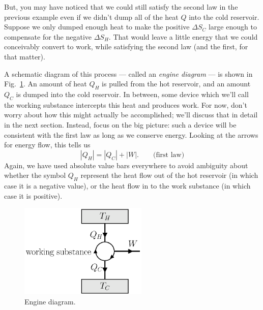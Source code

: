 But, you may have noticed that we could still satisfy the second law in
the previous example even if we didn't dump all of the heat $Q$ into the
cold reservoir.  Suppose we only dumped enough heat to make the positive
$\Delta S_C$ large enough to compensate for the negative $\Delta S_H$.
That would leave a little energy that we could conceivably convert to
work, while satisfying the second law (and the first, for that matter).

A schematic diagram of this process --- called an {\it engine diagram}
--- is shown in Fig.~\ref{fig:engine_diagram}.  An amount of heat
$Q_H$ is pulled from the hot reservoir, and an amount $Q_C$ is dumped
into the cold reservoir.  In between, some device which we'll call the
working substance intercepts this heat and produces work.  For now,
don't worry about how this might actually be accomplished; we'll
discuss that in detail in the next section.  Instead, focus on the big
picture: such a device will be consistent with the first law as long
as we conserve energy.  Looking at the arrows for energy flow, this
tells us
\begin{equation}
|Q_H| = |Q_C| + |W|. \qquad\text{(first law)}
\end{equation}
Again, we have used absolute value bars everywhere to avoid ambiguity about
whether the symbol $Q_H$ represent the heat flow out of the hot
reservoir (in which case it is a negative value), or the heat flow in
to the work substance (in which case it is positive). 

\begin{figure}
\begin{center}
\includegraphics[width=2.4in]{heat_engines/engine_diagram.eps}
\caption{Engine diagram.}
\label{fig:engine_diagram}
\end{center}
\end{figure}

